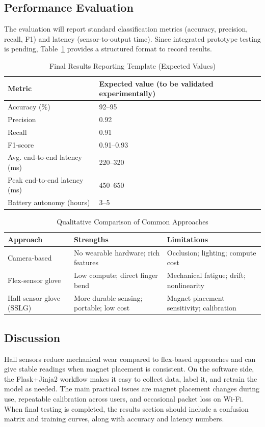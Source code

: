 \documentclass[conference]{IEEEtran}
\begin{document}
\subsection{Performance Evaluation}
The evaluation will report standard classification metrics (accuracy, precision, recall, F1) and latency (sensor-to-output time). Since integrated prototype testing is pending, Table~\ref{tab:metrics} provides a structured format to record results.

\begin{table}[htbp]
    \centering
    \caption{Final Results Reporting Template (Expected Values)}
    \label{tab:metrics}
    \begin{tabularx}{\columnwidth}{@{}lX@{}}
        \toprule
        Metric & Expected value (to be validated experimentally) \\
        \midrule
        Accuracy (\%) & 92--95 \\
        Precision & 0.92 \\
        Recall & 0.91 \\
        F1-score & 0.91--0.93 \\
        Avg. end-to-end latency (ms) & 220--320 \\
        Peak end-to-end latency (ms) & 450--650 \\
        Battery autonomy (hours) & 3--5 \\
        \bottomrule
    \end{tabularx}
\end{table}

\begin{table}[htbp]
    \centering
    \caption{Qualitative Comparison of Common Approaches}
    \label{tab:comparison}
    \begin{tabularx}{\columnwidth}{@{}lXX@{}}
        \toprule
        Approach & Strengths & Limitations \\
        \midrule
        Camera-based & No wearable hardware; rich features & Occlusion; lighting; compute cost\cite{mitra} \\
        Flex-sensor glove & Low compute; direct finger bend & Mechanical fatigue; drift; nonlinearity \\
        Hall-sensor glove (SSLG) & More durable sensing; portable; low cost & Magnet placement sensitivity; calibration \\
        \bottomrule
    \end{tabularx}
\end{table}

\subsection{Discussion}
Hall sensors reduce mechanical wear compared to flex-based approaches and can give stable readings when magnet placement is consistent. On the software side, the Flask+Jinja2 workflow makes it easy to collect data, label it, and retrain the model as needed. The main practical issues are magnet placement changes during use, repeatable calibration across users, and occasional packet loss on Wi-Fi. When final testing is completed, the results section should include a confusion matrix and training curves, along with accuracy and latency numbers.
\end{document}
